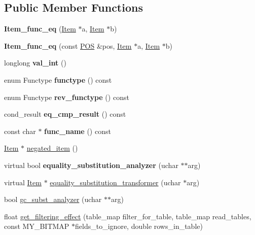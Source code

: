 \subsection*{Public Member Functions}
\begin{DoxyCompactItemize}
\item 
\mbox{\label{classItem__func__eq_a6bbce0aae87d738da833b5a1bc830dec}} 
{\bfseries Item\+\_\+func\+\_\+eq} (\mbox{\hyperlink{classItem}{Item}} $\ast$a, \mbox{\hyperlink{classItem}{Item}} $\ast$b)
\item 
\mbox{\label{classItem__func__eq_a9de46532666943bcf4e3351a5959d391}} 
{\bfseries Item\+\_\+func\+\_\+eq} (const \mbox{\hyperlink{structYYLTYPE}{P\+OS}} \&pos, \mbox{\hyperlink{classItem}{Item}} $\ast$a, \mbox{\hyperlink{classItem}{Item}} $\ast$b)
\item 
\mbox{\label{classItem__func__eq_a6d7327ea9ad7cbaca754e4dc5a843702}} 
longlong {\bfseries val\+\_\+int} ()
\item 
\mbox{\label{classItem__func__eq_a61941eae1f1ab18c3c98461e0f0a833f}} 
enum Functype {\bfseries functype} () const
\item 
\mbox{\label{classItem__func__eq_a4d6e7526b5266e2adaeba3d5dc9df439}} 
enum Functype {\bfseries rev\+\_\+functype} () const
\item 
\mbox{\label{classItem__func__eq_a048463d60c25cf3568b4255b9d0eea41}} 
cond\+\_\+result {\bfseries eq\+\_\+cmp\+\_\+result} () const
\item 
\mbox{\label{classItem__func__eq_a641ba33c832bf1211971b7d1b85e3e0b}} 
const char $\ast$ {\bfseries func\+\_\+name} () const
\item 
\mbox{\hyperlink{classItem}{Item}} $\ast$ \mbox{\hyperlink{classItem__func__eq_a5e6489bc7481658c4f878ad99846f323}{negated\+\_\+item}} ()
\item 
\mbox{\label{classItem__func__eq_ac9ebfc6fa87c3bc4d618346b600ba2bc}} 
virtual bool {\bfseries equality\+\_\+substitution\+\_\+analyzer} (uchar $\ast$$\ast$arg)
\item 
virtual \mbox{\hyperlink{classItem}{Item}} $\ast$ \mbox{\hyperlink{classItem__func__eq_ac77ed08d8277717b04bf0878069cb25a}{equality\+\_\+substitution\+\_\+transformer}} (uchar $\ast$arg)
\item 
bool \mbox{\hyperlink{classItem__func__eq_a085a3e6f03cf5e3915949e4f6bc9f53c}{gc\+\_\+subst\+\_\+analyzer}} (uchar $\ast$$\ast$arg)
\item 
float \mbox{\hyperlink{classItem__func__eq_a2fcef97ba353457bb567011be900a680}{get\+\_\+filtering\+\_\+effect}} (table\+\_\+map filter\+\_\+for\+\_\+table, table\+\_\+map read\+\_\+tables, const M\+Y\+\_\+\+B\+I\+T\+M\+AP $\ast$fields\+\_\+to\+\_\+ignore, double rows\+\_\+in\+\_\+table)
\end{DoxyCompactItemize}
